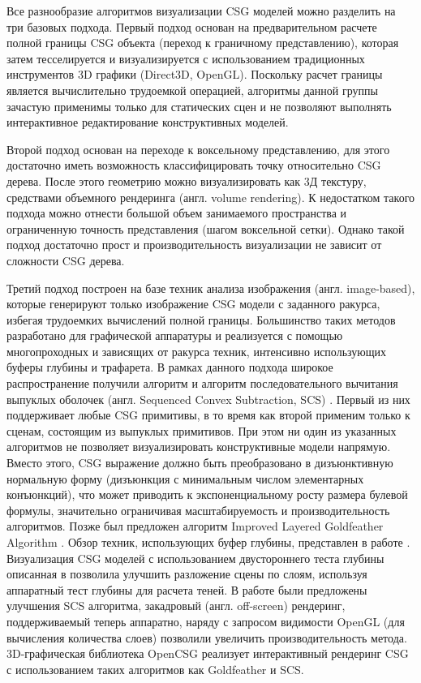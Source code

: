 Все разнообразие алгоритмов визуализации CSG моделей можно разделить на три базовых подхода. Первый подход основан на предварительном расчете полной границы CSG объекта (переход к граничному представлению), которая затем тесселируется и визуализируется с использованием традиционных инструментов 3D графики (Direct3D, OpenGL). Поскольку расчет границы является  вычислительно трудоемкой операцией, алгоритмы данной группы зачастую применимы только для статических сцен и не позволяют выполнять интерактивное редактирование конструктивных моделей.

Второй подход основан на переходе к воксельному представлению, для этого достаточно иметь возможность классифицировать точку относительно CSG дерева. После этого геометрию можно визуализировать как 3Д текстуру, средствами объемного рендеринга (англ. volume rendering). К недостатком такого подхода можно отнести большой объем занимаемого пространства и ограниченную точность представления (шагом воксельной сетки). Однако такой подход достаточно прост и производительность визуализации не зависит от сложности CSG дерева.

Третий подход построен на базе техник анализа изображения (англ. image-based), которые генерируют только изображение CSG модели с заданного ракурса, избегая трудоемких вычислений полной границы. Большинство таких методов разработано для графической аппаратуры и реализуется с помощью многопроходных и зависящих от ракурса техник, интенсивно использующих буферы глубины и трафарета. В рамках данного подхода широкое распространение получили алгоритм \cite{goldfeather1989near} и алгоритм последовательного вычитания выпуклых оболочек (англ. Sequenced Convex Subtraction, SCS) \cite{stewart2002linear}. Первый из них поддерживает любые CSG примитивы, в то время как второй применим только к сценам, состоящим из выпуклых примитивов. При этом ни один из указанных  алгоритмов не позволяет визуализировать конструктивные модели напрямую. Вместо этого, CSG выражение должно быть преобразовано в дизъюнктивную нормальную форму (дизъюнкция с минимальным числом элементарных конъюнкций), что может приводить к экспоненциальному росту размера булевой формулы, значительно ограничивая  масштабируемость и производительность алгоритмов. Позже был предложен алгоритм Improved Layered Goldfeather Algorithm \cite{erhart2000general}. Обзор техник, использующих буфер глубины, представлен в работе \cite{theoharis2001magic}. Визуализация CSG моделей с использованием двустороннего теста глубины описанная в \cite{guha2003application} позволила улучшить разложение сцены по слоям, используя аппаратный тест глубины для расчета теней. В работе \cite{kirsch2004rendering} были предложены улучшения SCS алгоритма, закадровый (англ. off-screen) рендеринг, поддерживаемый теперь аппаратно, наряду с запросом видимости OpenGL (для вычисления количества слоев) позволили увеличить производительность метода. 3D-графическая библиотека OpenCSG \cite{kirsch2005opencsg} реализует интерактивный рендеринг CSG с использованием таких алгоритмов как Goldfeather и SCS. 

